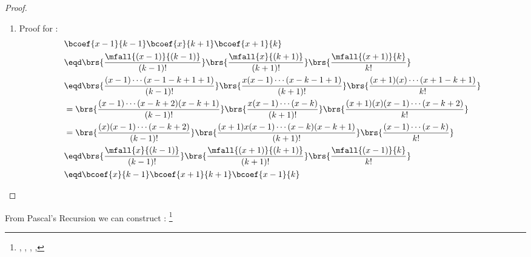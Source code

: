 \begin{proof}
\begin{enumerate}
  \item Proof for :
    \begin{align*}
      &\bcoef{x-1}{k-1} \bcoef{x}{k+1} \bcoef{x+1}{k}
      \\&\eqd \brs{\frac{\mfall{(x-1)}{(k-1)}}{(k-1)!}} \brs{\frac{\mfall{x}{(k+1)}}{(k+1)!}} \brs{\frac{\mfall{(x+1)}{k}}{k!}}
      \\&\eqd \brs{\frac{(x-1)\cdots(x-1-k+1+1)}{(k-1)!}} \brs{\frac{x(x-1)\cdots(x-k-1+1)}{(k+1)!}} \brs{\frac{(x+1)(x)\cdots(x+1-k+1)}{k!}}
      \\&=    \brs{\frac{(x-1)\cdots(x-k+2)(x-k+1)}{(k-1)!}} \brs{\frac{x(x-1)\cdots(x-k)}{(k+1)!}} \brs{\frac{(x+1)(x)(x-1)\cdots(x-k+2)}{k!}}
      \\&=    \brs{\frac{(x)(x-1)\cdots(x-k+2)}{(k-1)!}} \brs{\frac{(x+1)x(x-1)\cdots(x-k)(x-k+1)}{(k+1)!}} \brs{\frac{(x-1)\cdots(x-k)}{k!}}
      \\&\eqd \brs{\frac{\mfall{x}{(k-1)}}{(k-1)!}} \brs{\frac{\mfall{(x+1)}{(k+1)}}{(k+1)!}} \brs{\frac{\mfall{(x-1)}{k}}{k!}}
      \\&\eqd \bcoef{x}{k-1} \bcoef{x+1}{k+1} \bcoef{x-1}{k}
    \end{align*}
\end{enumerate}
\end{proof}



From Pascal's Recursion we can construct :%
\footnote{
  ,
  ,
  ,
  ,
  }

